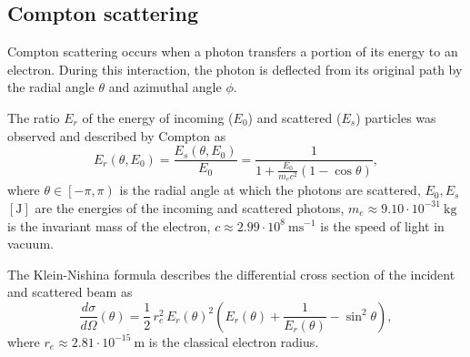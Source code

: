 \documentclass[a4paper,12pt,titlepage, twoside]{article}
\newcommand{\unit}[2]{$#1~\ensuremath{\mathrm{#2}}$}
\begin{document}


\subsection{Compton scattering}

Compton scattering occurs when a photon transfers a portion of its energy to an electron.
During this interaction, the photon is deflected from its original path by the radial angle $\theta$ and azimuthal angle $\phi$.

The ratio $E_r$ of the energy of incoming ($E_{0}$) and scattered ($E_{s}$) particles was observed and described by Compton as
\begin{equation}
  E_r\left(\theta, E_0\right) = \frac{E_s\left(\theta, E_0\right)}{E_{0}} = \frac{1}{1 + \frac{E_0}{m_ec^2}\left(1 - \cos\theta\right)},
\end{equation}
where $\theta \in \left[-\pi, \pi\right)$ is the radial angle at which the photons are scattered, $E_0, E_s$ $\left[\mathrm{J}\right]$ are the energies of the incoming and scattered photons, \unit{m_e \approx 9.10 \cdot 10^{-31}}{kg} is the invariant mass of the electron, \unit{c \approx 2.99 \cdot 10^{8}}{ms^{-1}} is the speed of light in vacuum.

The Klein-Nishina formula \cite{leo2012techniques} describes the differential cross section of the incident and scattered beam as
\begin{equation}
  \frac{d\sigma}{d\Omega}\left(\theta\right) = \frac{1}{2}\,r_{e}^2\,E_r\left(\theta\right)^2\left(E_r\left(\theta\right) + \frac{1}{E_r\left(\theta\right)} - \sin^2\theta\right),
\end{equation}
where \unit{r_e \approx 2.81 \cdot 10^{-15}}{m} is the classical electron radius.

\end{document}
